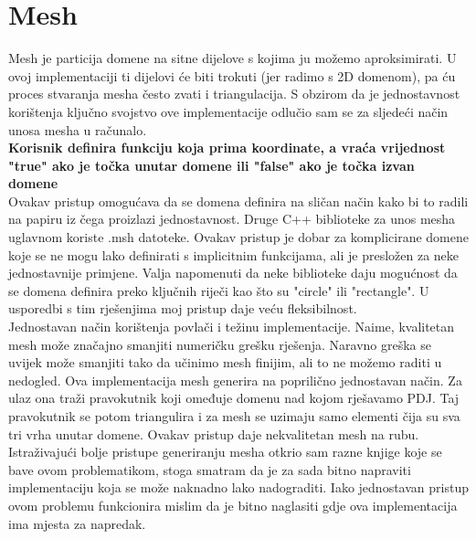 \documentclass[zavrsnirad]{../fer}
\begin{document}
\section{Mesh}
\label{mesh}
Mesh je particija domene na sitne dijelove s kojima ju
možemo aproksimirati. U ovoj implementaciji ti dijelovi 
će biti trokuti (jer radimo s 2D domenom), pa ću proces
stvaranja mesha često zvati i triangulacija. S obzirom da
je jednostavnost korištenja ključno svojstvo ove implementacije 
odlučio sam se za sljedeći način unosa mesha u računalo.
\bigskip
\\ 
\textbf{Korisnik definira funkciju koja prima koordinate, a
vraća vrijednost "true" ako je točka unutar domene ili
"false" ako je točka izvan domene}
\bigskip
\\ 
Ovakav pristup omogućava da se domena definira na sličan 
način kako bi to radili na papiru iz čega proizlazi jednostavnost.
Druge C++ biblioteke za unos mesha uglavnom koriste .msh datoteke.
Ovakav pristup je dobar za komplicirane domene koje se ne mogu
lako definirati s implicitnim funkcijama, ali je presložen za neke
jednostavnije primjene. Valja napomenuti da neke biblioteke 
daju mogućnost da se domena definira preko ključnih riječi kao 
što su "circle" ili "rectangle". U usporedbi s tim rješenjima 
moj pristup daje veću fleksibilnost.
\bigskip
\\ 
Jednostavan način korištenja povlači i težinu implementacije.
Naime, kvalitetan mesh može značajno smanjiti numeričku grešku
rješenja. Naravno greška se uvijek može smanjiti tako da 
učinimo mesh finijim, ali to ne možemo raditi u nedogled.
Ova implementacija mesh generira na poprilično jednostavan način.
Za ulaz ona traži pravokutnik koji omeđuje domenu nad kojom
rješavamo PDJ. Taj pravokutnik se potom triangulira i za mesh
se uzimaju samo elementi čija su sva tri vrha unutar domene.
Ovakav pristup daje nekvalitetan mesh na rubu. Istraživajući
bolje pristupe generiranju mesha otkrio sam razne knjige koje
se bave ovom problematikom, stoga smatram da je za sada
bitno napraviti implementaciju koja se može naknadno lako 
nadograditi. Iako jednostavan pristup ovom problemu funkcionira
mislim da je bitno naglasiti gdje ova implementacija ima
mjesta za napredak.
\end{document}
